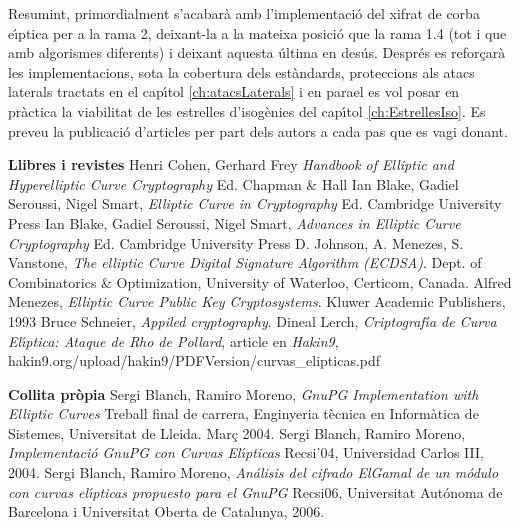 \documentclass[12pt,twoside,catalan,a4paper]{book}%
\numberwithin{figure}{section}		%
\theoremstyle{definition}   			%
\def\ce{corba e\lgem{}\'{\i}ptica}%
\theoremstyle{saltolinea}   			%
\begin{document}
Resumint, primordialment s'acabar\`a amb l'implementaci\'o del xifrat de \ce{} per a la rama 2, deixant-la a la mateixa posici\'o que la rama 1.4 (tot i que amb algorismes diferents) i deixant aquesta \'ultima en des\'us. Despr\'es es refor\c{c}ar\`a les implementacions, sota la cobertura dels est\`andards, proteccions als atacs laterals tractats en el cap\'{\i}tol \ref{ch:atacsLaterals} i en para\lgem{}el es vol posar en pr\`actica la viabilitat de les estrelles d'isog\`enies del cap\'{\i}tol \ref{ch:EstrellesIso}. Es preveu la publicaci\'o d'articles per part dels autors a cada pas que es vagi donant.


\begin{thebibliography}{1}
\vspace{5mm}
 {\large\bf Llibres i revistes}
 Henri Cohen, Gerhard Frey \textit{Handbook of Elliptic and Hyperelliptic Curve Cryptography} Ed. Chapman \& Hall
 Ian Blake, Gadiel Seroussi, Nigel Smart, \textit{Elliptic Curve in Cryptography} Ed. Cambridge University Press
 Ian Blake, Gadiel Seroussi, Nigel Smart, \textit{Advances in Elliptic Curve Cryptography} Ed. Cambridge University Press
D. Johnson, A. Menezes, S. Vanstone, \textit{The elliptic Curve Digital Signature Algorithm (ECDSA)}. Dept. of Combinatorics \& Optimization, University of Waterloo, Certicom, Canada.
Alfred Menezes, \textit{Elliptic Curve Public Key Cryptosystems}. Kluwer Academic Publishers, 1993
 Bruce Schneier, \textit{Appiled cryptography}.
 Dineal Lerch, \emph{Criptograf\'{\i}a de Curva El\'{\i}ptica: Ataque de Rho de Pollard}, article en \emph{Hakin9}, hakin9.org/upload/hakin9/PDFVersion/curvas\_elipticas.pdf

\vspace{5mm}
 {\large\bf Collita pr\`opia}
 Sergi Blanch, Ramiro Moreno, \emph{GnuPG Implementation with Elliptic Curves} Treball final de carrera, Enginyeria t\`ecnica en Inform\`atica de Sistemes, Universitat de Lleida. Mar\c{c} 2004.
 Sergi Blanch, Ramiro Moreno, \emph{Implementaci\'o GnuPG con Curvas El\'{\i}pticas} Recsi'04, Universidad Carlos III, 2004.
 Sergi Blanch, Ramiro Moreno, \emph{An\'alisis del cifrado ElGamal de un m\'odulo con curvas el\'{\i}pticas propuesto para el GnuPG} Recsi06, Universitat Aut\'onoma de Barcelona i Universitat Oberta de Catalunya, 2006.


\end{thebibliography}
\end{document}
